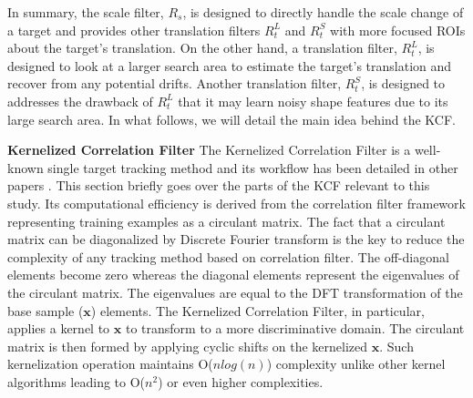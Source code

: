 \documentclass[10pt,twocolumn,letterpaper]{article}
\begin{document}
In summary, the scale filter, $R_{s}$, is designed to directly handle
the scale change of a target and provides other translation filters
$R_{t}^{L}$ and $R_{t}^{S}$ with more focused ROIs about the target's
translation. On the other hand, a translation filter, $R_{t}^{L}$, is
designed to look at a larger search area to estimate the target's
translation and recover from any potential drifts. Another translation
filter, $R_{t}^{S}$, is designed to addresses the drawback of
$R_{t}^{L}$ that it may learn noisy shape features due to its large
search area. In what follows, we will detail the main idea behind the
KCF.

\textbf{Kernelized Correlation Filter} The Kernelized Correlation
Filter is a well-known single target tracking method and its workflow
has been detailed in other papers
\cite{henriques2012exploiting,henriques2015high}. This section briefly
goes over the parts of the KCF relevant to this study. Its
computational efficiency is derived from the correlation filter
framework representing training examples as a circulant matrix. The
fact that a circulant matrix can be diagonalized by Discrete Fourier
transform is the key to reduce the complexity of any tracking method
based on correlation filter. The off-diagonal elements become zero
whereas the diagonal elements represent the eigenvalues of the
circulant matrix. The eigenvalues are equal to the DFT transformation
of the base sample ($\mathbf{x}$) elements. The Kernelized Correlation
Filter, in particular, applies a kernel to $\mathbf{x}$ to transform
to a more discriminative domain. The circulant matrix is then formed
by applying cyclic shifts on the kernelized $\mathbf{x}$. Such
kernelization operation maintains O($nlog(n)$) complexity unlike other
kernel algorithms leading to O($n^{2}$) or even higher complexities.
\end{document}
